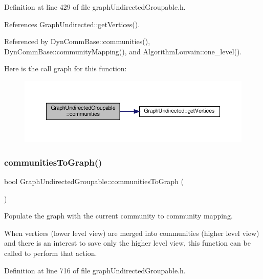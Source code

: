 Definition at line 429 of file graph\+Undirected\+Groupable.\+h.



References Graph\+Undirected\+::get\+Vertices().



Referenced by Dyn\+Comm\+Base\+::communities(), Dyn\+Comm\+Base\+::community\+Mapping(), and Algorithm\+Louvain\+::one\+\_\+level().

Here is the call graph for this function\+:\nopagebreak
\begin{figure}[H]
\begin{center}
\leavevmode
\includegraphics[width=350pt]{classGraphUndirectedGroupable_a57f8ea4cff0d83b80cca2dc8e8e19ff6_cgraph}
\end{center}
\end{figure}
\mbox{\label{classGraphUndirectedGroupable_af6fc2c9e8aad7c6bce37d30eeaf184a8}} 
\subsubsection{\texorpdfstring{communities\+To\+Graph()}{communitiesToGraph()}}
{\footnotesize\ttfamily bool Graph\+Undirected\+Groupable\+::communities\+To\+Graph (\begin{DoxyParamCaption}{ }\end{DoxyParamCaption})\hspace{0.3cm}{\ttfamily [inline]}}



Populate the graph with the current community to community mapping. 

When vertices (lower level view) are merged into communities (higher level view) and there is an interest to save only the higher level view, this function can be called to perform that action.

Definition at line 716 of file graph\+Undirected\+Groupable.\+h.



